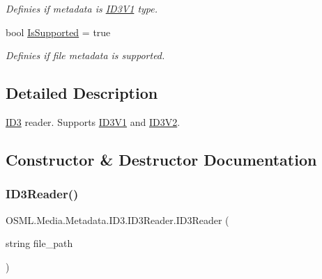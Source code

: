 \begin{DoxyCompactItemize}
\begin{DoxyCompactList}\small\item\em Definies if metadata is \mbox{\hyperlink{classOSML_1_1Media_1_1Metadata_1_1ID3_1_1ID3V1}{I\+D3\+V1}} type. \end{DoxyCompactList}\item 
bool \mbox{\hyperlink{classOSML_1_1Media_1_1Metadata_1_1ID3_1_1ID3Reader_aaff60ceaf8e5bcafe091cc8811df82ad}{Is\+Supported}} = true
\begin{DoxyCompactList}\small\item\em Definies if file metadata is supported. \end{DoxyCompactList}\end{DoxyCompactItemize}


\subsection{Detailed Description}
\mbox{\hyperlink{namespaceOSML_1_1Media_1_1Metadata_1_1ID3}{I\+D3}} reader. Supports \mbox{\hyperlink{classOSML_1_1Media_1_1Metadata_1_1ID3_1_1ID3V1}{I\+D3\+V1}} and \mbox{\hyperlink{classOSML_1_1Media_1_1Metadata_1_1ID3_1_1ID3V2}{I\+D3\+V2}}. 



\subsection{Constructor \& Destructor Documentation}
\mbox{\label{classOSML_1_1Media_1_1Metadata_1_1ID3_1_1ID3Reader_a5304df793306ced2d9a64111537b7529}} 
\subsubsection{\texorpdfstring{ID3Reader()}{ID3Reader()}\hspace{0.1cm}{\footnotesize\ttfamily [1/2]}}
{\footnotesize\ttfamily O\+S\+M\+L.\+Media.\+Metadata.\+I\+D3.\+I\+D3\+Reader.\+I\+D3\+Reader (\begin{DoxyParamCaption}\item[{string}]{file\+\_\+path }\end{DoxyParamCaption})\hspace{0.3cm}{\ttfamily [inline]}}



